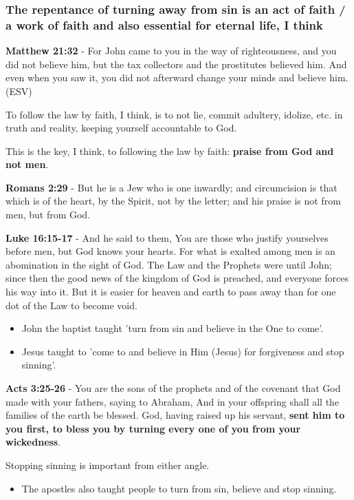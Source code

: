 \documentclass[11pt]{article}
\begin{document}
\subsubsection{The repentance of turning away from sin is an act of faith / a work of faith and also essential for eternal life, I think}
\label{sec:org9c673f9}
\textbf{Matthew 21:32} - For John came to you in the way of righteousness, and you did not believe him, but the tax collectors and the prostitutes believed him. And even when you saw it, you did not afterward change your minds and believe him. (ESV)

To follow the law by faith, I think, is to not lie, commit adultery, idolize, etc. in truth and reality, keeping yourself accountable to God.

This is the key, I think, to following the law by faith: \textbf{praise from God and not men}.

\textbf{Romans 2:29} - But he is a Jew who is one inwardly; and circumcision is that which is of the heart, by the Spirit, not by the letter; and his praise is not from men, but from God.

\textbf{Luke 16:15-17} - And he said to them, You are those who justify yourselves before men, but God knows your hearts. For what is exalted among men is an abomination in the sight of God.  The Law and the Prophets were until John; since then the good news of the kingdom of God is preached, and everyone forces his way into it.  But it is easier for heaven and earth to pass away than for one dot of the Law to become void.

\begin{itemize}
\item John the baptist taught 'turn from sin and believe in the One to come'.
\item Jesus taught to 'come to and believe in Him (Jesus) for forgiveness and stop sinning'.
\end{itemize}

\textbf{Acts 3:25-26} - You are the sons of the prophets and of the covenant that God made with your fathers, saying to Abraham, And in your offspring shall all the families of the earth be blessed. God, having raised up his servant, \textbf{sent him to you first, to bless you by turning every one of you from your wickedness}.

Stopping sinning is important from either angle.

\begin{itemize}
\item The apostles also taught people to turn from sin, believe and stop sinning.
\end{itemize}
\end{document}
